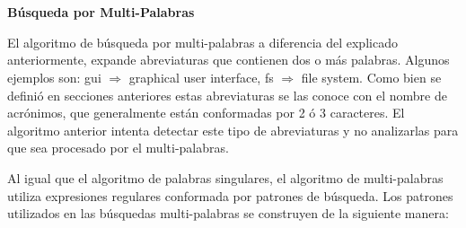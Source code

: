 \noindent \textbf{\\\\Búsqueda por Multi-Palabras\\}

El algoritmo de búsqueda por multi-palabras a diferencia del explicado anteriormente, expande abreviaturas que contienen dos o más palabras. Algunos ejemplos son: \textsf{gui $\Rightarrow$ graphical user interface, fs $\Rightarrow$ file system}. Como bien se definió en secciones anteriores estas abreviaturas se las conoce con el nombre de acrónimos, que generalmente están conformadas por 2 ó 3 caracteres. El algoritmo anterior intenta detectar este tipo de abreviaturas y no analizarlas para que sea procesado por el multi-palabras.

Al igual que el algoritmo de palabras singulares, el algoritmo de multi-palabras utiliza expresiones regulares conformada por patrones de búsqueda. Los patrones utilizados en las búsquedas multi-palabras se construyen de la siguiente manera:





